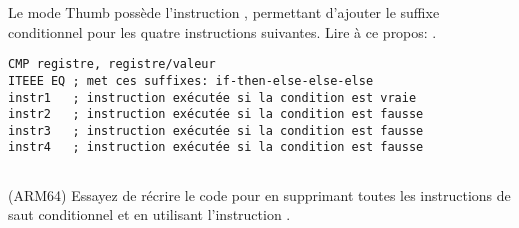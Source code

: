 Le mode Thumb possède l'instruction , permettant d'ajouter le suffixe conditionnel
pour les quatre instructions suivantes.
Lire à ce propos: .

\begin{lstlisting}[caption=ARM (\ThumbMode),style=customasmARM]
CMP registre, registre/valeur
ITEEE EQ ; met ces suffixes: if-then-else-else-else
instr1   ; instruction exécutée si la condition est vraie
instr2   ; instruction exécutée si la condition est fausse
instr3   ; instruction exécutée si la condition est fausse
instr4   ; instruction exécutée si la condition est fausse
\end{lstlisting}

\subsection{\Exercise}

(ARM64) Essayez de récrire le code pour  en supprimant toutes
les instructions de saut conditionnel et en utilisant l'instruction .

